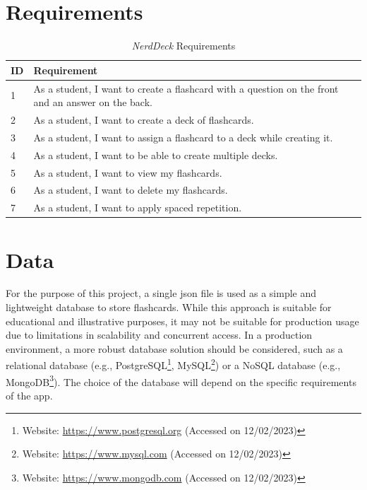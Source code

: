     \section{Requirements}
    \begin{table}[h]
        \centering
        \begin{tabular}{|m{0.5in}|m{4in}|}
            \hline
            \textbf{ID} & \textbf{Requirement} \\
            \hline
            1 & As a student, I want to create a flashcard with a question on the front and an answer on the back. \\
            \hline
            2 & As a student, I want to create a deck of flashcards. \\
            \hline
            3 & As a student, I want to assign a flashcard to a deck while creating it. \\
            \hline
            4 & As a student, I want to be able to create multiple decks. \\
            \hline
            5 & As a student, I want to view my flashcards. \\
            \hline
            6 & As a student, I want to delete my flashcards. \\
            \hline
            7 & As a student, I want to apply spaced repetition. \\
            \hline
        \end{tabular}
        \caption{\textit{NerdDeck} Requirements}
        \label{tab:requirements}
    \end{table}

    \section{Data}
    For the purpose of this project, a single \ac{json} file is used as a simple and lightweight database to store flashcards. While this approach is suitable for educational and illustrative purposes, it may not be suitable for production usage due to limitations in scalability and concurrent access. In a production environment, a more robust database solution should be considered, such as a relational database (e.g., PostgreSQL\footnote{Website: \url{https://www.postgresql.org} (Accessed on 12/02/2023)}, MySQL\footnote{Website: \url{https://www.mysql.com} (Accessed on 12/02/2023)}) or a NoSQL database (e.g., MongoDB\footnote{Website: \url{https://www.mongodb.com} (Accessed on 12/02/2023)}). The choice of the database will depend on the specific requirements of the \ac{app}.

